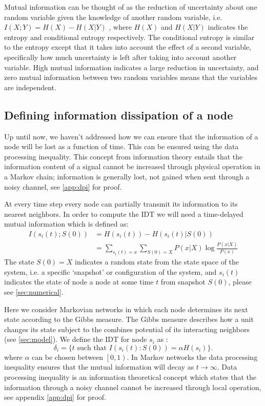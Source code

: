 \documentclass[twoside, twocolumn]{article}
\begin{document}
	Mutual information can be thought of as the reduction of uncertainty about one random variable given the knowledge of another random variable, i.e. $I(X;Y) = H(X) - H(X \vert Y)$ , where $H(X)$ and $H(X\vert Y)$ indicates the entropy and conditional entropy respectively. The conditional entropy is similar to the entropy except that it takes into  account the effect of a second variable, specifically how much uncertainty is left after taking into account another variable. High mutual information indicates a large reduction in uncertainty, and zero mutual information between two random variables means that the variables are independent.

	\subsection{Defining information dissipation of a node}
	Up until now, we haven't addressed how we can ensure that the information of a node will be lost as a function of time. This can be ensured using the data processing inequality. This concept from information theory entails that the information content of a signal cannot be increased through physical operation in a Markov chain; information is generally lost, not gained when sent through a noisy channel, see \ref{app:dpi} for proof.

	At every time step every node can partially transmit its information to its nearest neighbors. In order to compute the IDT we will need a time-delayed mutual information which is defined as:
	\begin{equation} \label{eq:mi}
	\begin{aligned}
	I(s_i(t) ; S(0)) &= H(s_i(t)) - H(s_i(t) \vert S(0)) \\
	&= \sum_{s_i(t)=x}  \sum_{S(0) = X} P(x \vert X) \log \frac{P(x \vert X)}{P(x)}
	\end{aligned}
	\end{equation}
	The state $S(0) = X$ indicates a random state from the state space of the system, i.e. a specific `snapshot' or configuration of the system, and $s_i(t)$ indicates the state of node a node at some time $t$ from snapshot $S(0)$, please see \ref{sec:numerical}.

	Here we consider Markovian networks in which each node determines its next state according to the Gibbs measure. The Gibbs measure describes how a unit changes its state subject to the combines potential of its interacting neighbors (see \ref{sec:model}). We define the IDT for node $s_i$ as :
	\begin{equation}
	\delta_i = \{t \textrm{ \ such that \ } I\left( s_i(t) : S(0) \right) = \alpha H\left(s_i \right)\}.
	\end{equation}
	where $\alpha$ can be chosen between $\left[ 0, 1 \right)$. In Markov networks the data processing inequality ensures that the mutual information will decay as $t \rightarrow \infty$. Data processing inequality is an information theoretical concept which states that the information through a noisy channel cannot be increased through local operation, see appendix \ref{app:dpi} for proof.
\end{document}
